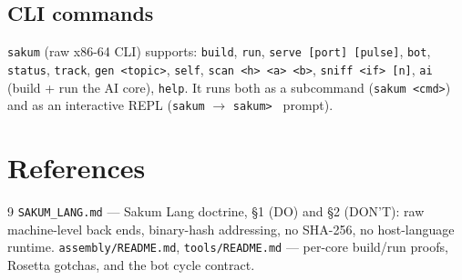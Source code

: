 \subsection{CLI commands}

\texttt{sakum} (raw x86-64 CLI) supports: \texttt{build}, \texttt{run},
\texttt{serve [port] [pulse]}, \texttt{bot}, \texttt{status}, \texttt{track},
\texttt{gen <topic>}, \texttt{self}, \texttt{scan <h> <a> <b>},
\texttt{sniff <if> [n]}, \texttt{ai} (build + run the AI core),
\texttt{help}.  It runs both as a subcommand (\texttt{sakum <cmd>}) and as
an interactive REPL (\texttt{sakum} $\to$ \texttt{sakum> } prompt).

\section*{References}
\begin{thebibliography}{9}
   \texttt{SAKUM\_LANG.md} --- Sakum Lang doctrine,
    \S1 (DO) and \S2 (DON'T): raw machine-level back ends, binary-hash
    addressing, no SHA-256, no host-language runtime.
   \texttt{assembly/README.md},
    \texttt{tools/README.md} --- per-core build/run proofs, Rosetta
    gotchas, and the bot cycle contract.
\end{thebibliography}
